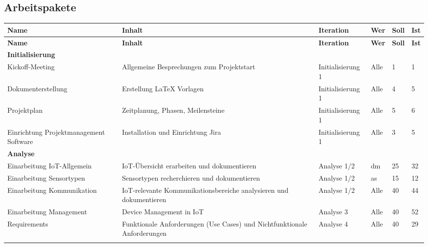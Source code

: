 \begin{landscape}
\subsection{Arbeitspakete}
\begin{longtable}{ p{5.5cm} p{8cm} l l p{1cm} p{1cm} }

\hline 
\multicolumn{1}{p{5.5cm}}{\textbf{Name}} & \multicolumn{1}{p{8cm}}{\textbf{Inhalt}} & \multicolumn{1}{l}{\textbf{Iteration}} & \multicolumn{1}{l}{\textbf{Wer}} & \multicolumn{1}{p{1cm}}{\textbf{Soll}} & \multicolumn{1}{p{1cm}}{\textbf{Ist}} \\ \hline 
\endfirsthead

\hline 
\multicolumn{1}{p{5.5cm}}{\textbf{Name}} & \multicolumn{1}{p{8cm}}{\textbf{Inhalt}} & \multicolumn{1}{l}{\textbf{Iteration}} & \multicolumn{1}{l}{\textbf{Wer}} & \multicolumn{1}{p{1cm}}{\textbf{Soll}} & \multicolumn{1}{p{1cm}}{\textbf{Ist}} \\ \hline 
\endhead

\textbf{Initialisierung}&&&&\\ \addlinespace
Kickoff-Meeting & Allgemeine Besprechungen zum Projektstart & Initialisierung 1 & Alle & 1 & 1 \\ \addlinespace
Dokumenterstellung & Erstellung \LaTeX{} Vorlagen & Initialisierung 1 & Alle & 4 & 5 \\ \addlinespace
Projektplan & Zeitplanung, Phasen, Meilensteine & Initialisierung 1 & Alle & 5 & 6 \\ \addlinespace
Einrichtung Projektmanagement Software & Installation und Einrichtung Jira & Initialisierung 1 & Alle & 3 & 5 \\ \addlinespace

\textbf{Analyse}&&&&\\ \addlinespace
Einarbeitung IoT-Allgemein & IoT-Übersicht erarbeiten und dokumentieren & Analyse 1/2 & dm & 25 & 32\\ \addlinespace
Einarbeitung Sensortypen & Sensortypen recherchieren und dokumentieren & Analyse 1/2 & as & 15 & 12\\ \addlinespace
Einarbeitung Kommunikation & IoT-relevante Kommunikationsbereiche analysieren und dokumentieren & Analyse 1/2 & Alle & 40 & 44\\ \addlinespace
Einarbeitung Management & Device Management in IoT & Analyse 3 & Alle & 40 & 52\\ \addlinespace
Requirements & Funktionale Anforderungen (Use Cases) und Nichtfunktionale Anforderungen & Analyse 4 & Alle & 40 & 29\\ \addlinespace



\end{longtable}
\end{landscape}
